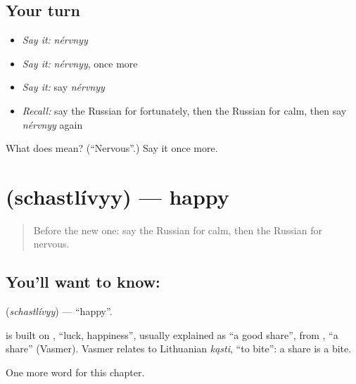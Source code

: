 \subsection*{Your turn}
\begin{itemize}
\raggedright
  \item \emph{Say it:} \emph{nérvnyy}
  \item \emph{Say it:} \emph{nérvnyy}, once more
  \item \emph{Say it:} say \emph{nérvnyy}
  \item \emph{Recall:} say the Russian for fortunately, then the Russian for calm, then say \emph{nérvnyy} again
\end{itemize}

\begin{tcolorbox}[breakable,colback=teal!4,colframe=teal!35!black,title={Before you move on}]
What does  mean? (\textquotedblleft{}Nervous\textquotedblright{}.) Say it once more.
\end{tcolorbox}
\section[\texorpdfstring{\ru{счастливый} (schastlívyy)}{счастливый (schastlívyy)}]{ (schastlívyy) — happy}

\label{lesson:RU-C216-schastlivyy}



\begin{quote}
Before the new one: say the Russian for calm, then the Russian for nervous.
\end{quote}

\subsection*{You'll want to know: }
\textbf{} (\emph{schastlívyy}) — \textquotedblleft{}happy\textquotedblright{}.

\begin{cousinweb}
\textbf{} is built on \emph{}, \textquotedblleft{}luck, happiness\textquotedblright{}, usually explained as \textquotedblleft{}a good share\textquotedblright{}, from \emph{}, \textquotedblleft{}a share\textquotedblright{} (Vasmer). Vasmer relates \emph{} to Lithuanian \emph{kąsti}, \textquotedblleft{}to bite\textquotedblright{}: a share is a bite.
\end{cousinweb}

\begin{grammarlens}[title={What you've built}]
One more word for this chapter.
\end{grammarlens}

